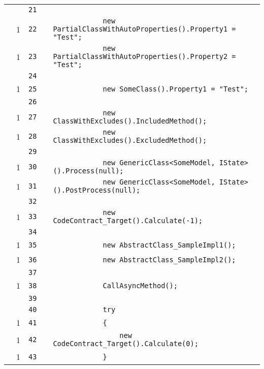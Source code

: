 \documentclass[a4paper,landscape,10pt]{article}
\begin{document}
\begin{longtable}[l]{lrrll}
\cellcolor{gray} &  & \verb~21~ & & \verb~~\\
\cellcolor{green} & 1 & \verb~22~ & & \verb~            new PartialClassWithAutoProperties().Property1 = "Test";~\\
\cellcolor{green} & 1 & \verb~23~ & & \verb~            new PartialClassWithAutoProperties().Property2 = "Test";~\\
\cellcolor{gray} &  & \verb~24~ & & \verb~~\\
\cellcolor{green} & 1 & \verb~25~ & & \verb~            new SomeClass().Property1 = "Test";~\\
\cellcolor{gray} &  & \verb~26~ & & \verb~~\\
\cellcolor{green} & 1 & \verb~27~ & & \verb~            new ClassWithExcludes().IncludedMethod();~\\
\cellcolor{green} & 1 & \verb~28~ & & \verb~            new ClassWithExcludes().ExcludedMethod();~\\
\cellcolor{gray} &  & \verb~29~ & & \verb~~\\
\cellcolor{green} & 1 & \verb~30~ & & \verb~            new GenericClass<SomeModel, IState>().Process(null);~\\
\cellcolor{green} & 1 & \verb~31~ & & \verb~            new GenericClass<SomeModel, IState>().PostProcess(null);~\\
\cellcolor{gray} &  & \verb~32~ & & \verb~~\\
\cellcolor{green} & 1 & \verb~33~ & & \verb~            new CodeContract_Target().Calculate(-1);~\\
\cellcolor{gray} &  & \verb~34~ & & \verb~~\\
\cellcolor{green} & 1 & \verb~35~ & & \verb~            new AbstractClass_SampleImpl1();~\\
\cellcolor{green} & 1 & \verb~36~ & & \verb~            new AbstractClass_SampleImpl2();~\\
\cellcolor{gray} &  & \verb~37~ & & \verb~~\\
\cellcolor{green} & 1 & \verb~38~ & & \verb~            CallAsyncMethod();~\\
\cellcolor{gray} &  & \verb~39~ & & \verb~~\\
\cellcolor{gray} &  & \verb~40~ & & \verb~            try~\\
\cellcolor{green} & 1 & \verb~41~ & & \verb~            {~\\
\cellcolor{green} & 1 & \verb~42~ & & \verb~                new CodeContract_Target().Calculate(0);~\\
\cellcolor{green} & 1 & \verb~43~ & & \verb~            }~\\

\end{longtable}
\end{document}

